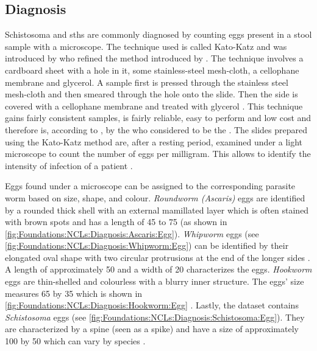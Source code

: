 \subsection{Diagnosis}
\label{sec:Foundations:NTDs:Diagnosis}

Schistosoma and \acp{sth} are commonly diagnosed by counting eggs present in a stool sample with a microscope. The technique used is called Kato-Katz \cite{nelwan2019schistosomiasis} and was introduced by \textcite{katz1972simple} who refined the method introduced by \citeauthor{kato1954comparative} \cite{kato1954comparative,kato1960correct}. The technique involves a cardboard sheet with a hole in it, some stainless-steel mesh-cloth, a cellophane membrane and glycerol. A sample first is pressed through the stainless steel mesh-cloth and then smeared through the hole onto the slide. Then the side is covered with a cellophane membrane and treated with glycerol \cite{mbongngwese2020diagnostic}. This technique gains fairly consistent samples, is fairly reliable, easy to perform and low cost \cite{katz1972simple} and therefore is, according to \textcite{mbongngwese2020diagnostic}, by the \ac{who} considered to be the .
The slides prepared using the Kato-Katz method are, after a resting period, examined under a light microscope to count the number of eggs per milligram. This allows to identify the intensity of infection of a patient \cite{feasey2010neglected}. 

Eggs found under a microscope can be assigned to the corresponding parasite worm based on size, shape, and colour. \emph{Roundworm (Ascaris)} eggs are identified by a rounded thick shell with an external mamillated layer which is often stained with brown spots and has a length of \unit{45}{\micro\meter} to \unit{75}{\micro\meter} \cite{dpdx2019ascariasis} (as shown in \autoref{fig:Foundations:NCLs:Diagnosis:Ascaris:Egg}).
\emph{Whipworm} eggs (see \autoref{fig:Foundations:NCLs:Diagnosis:Whipworm:Egg}) can be identified by their elongated oval shape with two circular protrusions at the end of the longer sides \cite{dpdx2017trichuriasis,larsson2020development}. A length of approximately \unit{50}{\micro\meter} and a width of \unit{20}{\micro\meter} characterizes the eggs.
\emph{Hookworm} eggs are thin-shelled and colourless with a blurry inner structure. The eggs' size measures \unit{65}{\micro\meter} by \unit{35}{\micro\meter} which is shown in \autoref{fig:Foundations:NCLs:Diagnosis:Hookworm:Egg} \cite{dpdx2019hookworm, larsson2020development}.
Lastly, the dataset contains \emph{Schistosoma} eggs (see \autoref{fig:Foundations:NCLs:Diagnosis:Schistosoma:Egg}). They are characterized by a spine (seen as a spike) 
and have a size of approximately \unit{100}{\micro\meter} by \unit{50}{\micro\meter} which can vary by species \cite{dpdx2019schistosomiasis, larsson2020development}.

